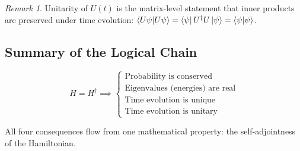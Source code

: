 \documentclass[11pt,a4paper]{article}
\theoremstyle{definition}
\theoremstyle{plain}
\theoremstyle{remark}
\newtheorem{remark}{Remark}[section]
\begin{document}
\begin{remark}
    Unitarity of $U(t)$ is the matrix-level statement that inner products are preserved under time evolution: $\braket{U\psi}{U\psi} = \bra{\psi}U^\dagger U\ket{\psi} = \braket{\psi}{\psi}$.
\end{remark}

\subsection{Summary of the Logical Chain}

\[
    H = H^\dagger \implies \begin{cases}
        \text{Probability is conserved} \\
        \text{Eigenvalues (energies) are real} \\
        \text{Time evolution is unique} \\
        \text{Time evolution is unitary}
    \end{cases}
\]

All four consequences flow from one mathematical property: the self-adjointness of the Hamiltonian.
\end{document}

